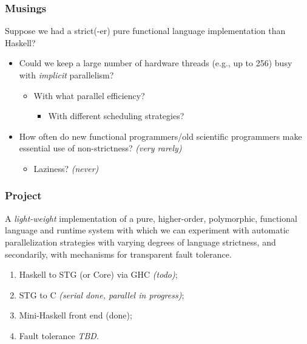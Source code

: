 \documentclass{beamer}
\begin{document}
\begin{frame}
  \frametitle{Musings}
  Suppose we had a strict(-er) pure functional language implementation than Haskell?
  \begin{itemize}
  \item<1-> Could we keep a large number of hardware threads (e.g., up to 256) busy with
    \emph{implicit} parallelism?
    \begin{itemize}
    \item With what parallel efficiency?
      \begin{itemize}
      \item With different scheduling strategies?
      \end{itemize}
    \end{itemize}
  \item<2-> How often do new functional programmers/old scientific programmers
    make essential use of non-strictness?  \emph{(very rarely)}
    \begin{itemize}
    \item Laziness? \emph{(never)}
    \end{itemize}
  \end{itemize}
\end{frame}


\begin{frame}
\frametitle{Project} 
A \emph{light-weight} implementation of a pure, higher-order, polymorphic,
functional language and runtime system with which we can experiment with
automatic parallelization strategies with varying degrees of language
strictness, and secondarily, with mechanisms for transparent fault tolerance.
\begin{enumerate}
\item<2-> Haskell to STG (or Core) via GHC \emph{(todo)};
  \\
\item<3-> STG to C \emph{(serial done, parallel in progress)};
  \\
\item<4-> Mini-Haskell front end (done);
  \\
\item<5-> Fault tolerance \emph{TBD}.
\end{enumerate}
\end{frame}
\end{document}
